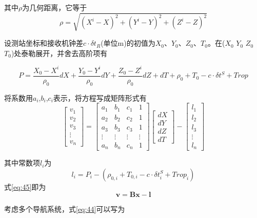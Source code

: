 \documentclass{ctexart}
\begin{document}
其中$\rho$为几何距离，它等于
\begin{equation}
\rho=\sqrt{(X^i-X)^2+(Y^i-Y)^2+(Z^i-Z)^2}
\label{eq:43}
\end{equation}

设测站坐标和接收机钟差$c\cdot\delta t_R$(单位m)的初值为$X_0$、$Y_0$、$Z_0$、$T_0$。在($X_0$ $Y_0$ $Z_0$ $T_0$)处泰勒展开，并舍去高阶项有

\begin{equation}
P=\frac{X_0-X^i}{\rho_0}dX+\frac{Y_0-Y^i}{\rho_0}dY+\frac{Z_0-Z^i}{\rho_0}dZ+dT+\rho_0+T_0 - c\cdot\delta t^S+Trop
\label{eq:44}
\end{equation}

将系数用$a_i$,$b_i$,$c_i$表示，将方程写成矩阵形式有
\begin{equation}
\begin{bmatrix}
v_1\\
v_2\\
v_3\\
\vdots\\
v_n
\end{bmatrix}=\begin{bmatrix}
a_1&b_1&c_1&1\\
a_2&b_2&c_2&1\\
a_3&b_3&c_3&1\\
\vdots&\vdots&\vdots&\vdots\\
a_n&b_n&c_n&1
\end{bmatrix}\begin{bmatrix}
dX\\
dY\\
dZ\\
dT
\end{bmatrix}-\begin{bmatrix}
l_1\\
l_2\\
l_3\\
\vdots\\
l_n
\end{bmatrix}
\label{eq:45}
\end{equation}

其中常数项$l_i$为
\begin{equation}
l_i=P_i-(\rho_{0,i}+T_{0,i}-c\cdot\delta t^S_i+Trop_i)
\end{equation}
式\eqref{eq:45}即为
\begin{equation}
\mathbf{v}=\mathbf{B}\mathbf{x}-\mathbf{l}
\label{eq:47}
\end{equation}

考虑多个导航系统，式\eqref{eq:44}可以写为
\end{document}
